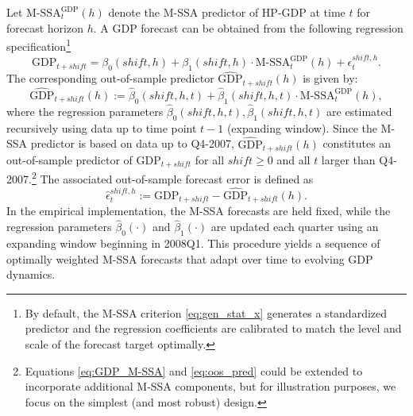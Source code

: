 \documentclass[11pt,a4paper]{article}
\begin{document}
Let $\textrm{M-SSA}^{\textrm{GDP}}_t(h)$ denote the M-SSA predictor of HP-GDP at time $t$ for forecast horizon $h$. A GDP forecast can be obtained from the following regression specification\footnote{By default, the M-SSA criterion \eqref{eq:gen_stat_x} generates a standardized predictor and the regression coefficients are calibrated to match the level and scale of the forecast target optimally.}
\begin{equation}
\textrm{GDP}_{t+shift}=\beta_0(shift,h)+\beta_1(shift,h) \cdot \textrm{M-SSA}^{\textrm{GDP}}_t(h) + \epsilon_t^{shift,h}.
\label{eq:GDP_M-SSA}
\end{equation}
The corresponding out-of-sample predictor $\widehat{\textrm{GDP}}_{t+shift}(h)$ is given by: 
\begin{equation}\label{eq:oos_pred}
\widehat{\textrm{GDP}}_{t+shift}(h):=\hat{\beta}_0(shift,h,t)+\hat{\beta}_1(shift,h,t) \cdot \textrm{M-SSA}^{\textrm{GDP}}_t(h),
\end{equation}
where the regression parameters $\hat{\beta}_0(shift,h,t),\hat{\beta}_1(shift,h,t)$ are estimated recursively using data up to time point $t-1$ (expanding window). Since the M-SSA predictor is based on data up to Q4-2007, $\widehat{\textrm{GDP}}_{t+shift}(h)$ constitutes an out-of-sample predictor of $\textrm{GDP}_{t+shift}$ for all $shift\geq 0$ and all $t$ larger than Q4-2007.\footnote{Equations \eqref{eq:GDP_M-SSA} and \eqref{eq:oos_pred} could be extended to incorporate additional M-SSA components, but for illustration purposes, we focus on the simplest (and most robust) design.} 
The associated out-of-sample forecast error is defined as
\begin{equation}\label{eq:oosfe}
\hat{\epsilon}_t^{shift,h}:={\textrm{GDP}}_{t+shift}-\widehat{\textrm{GDP}}_{t+shift}(h).
\end{equation}
In the empirical implementation, the M-SSA forecasts are held fixed, while the regression parameters $\hat{\beta}_0(\cdot)$ and $\hat{\beta}_1(\cdot)$ are updated each quarter using an expanding window beginning in 2008Q1. This procedure yields a sequence of optimally weighted M-SSA forecasts that adapt over time to evolving GDP dynamics.
\end{document}
